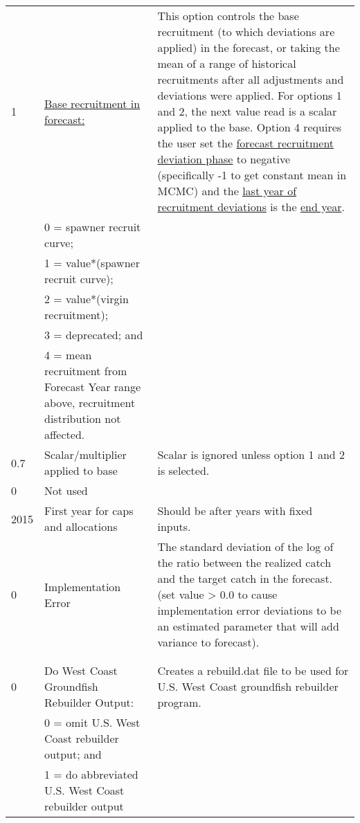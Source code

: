 \begin{landscape}
{\begin{longtable}{p{2cm} p{7cm} p{12cm}}
  \hline
  1 \Tstrut & \hyperlink{ForeSpawn}{Base recruitment in forecast:} \hypertarget{FcastRecruitment}{} & \multirow{1}{1cm}[-0.25cm]{\parbox{12cm}{This option controls the base recruitment (to which deviations are applied) in the forecast, or taking the mean of a range of historical recruitments after all adjustments and deviations were applied. For options 1 and 2, the next value read is a scalar applied to the base. Option 4 requires the user set the \hyperlink{FcastRecDevPhase}{forecast recruitment deviation phase} to negative (specifically -1 to get constant mean in MCMC) and the \hyperlink{RecDevEndYear}{last year of recruitment deviations} is the \hyperlink{EndYear}{end year}.}} \\
    & 0 = spawner recruit curve; & \\
    & 1 = value*(spawner recruit curve); & \\
    & 2 = value*(virgin recruitment); & \\
    & 3 = deprecated; and & \\
    & 4 = mean recruitment from Forecast Year range above, recruitment distribution not affected. & \Bstrut\\

  \hline
  0.7 \Tstrut & Scalar/multiplier applied to base & \multirow{1}{1cm}[-0.05cm]{\parbox{12cm}{Scalar is ignored unless option 1 and 2 is selected.}} \Bstrut\\

  \hline
  0 & Not used & \Tstrut\Bstrut\\
  
  \hline
  2015 \Tstrut & First year for caps and allocations & \multirow{1}{1cm}[-0.10cm]{\parbox{12cm}{Should be after years with fixed inputs.}} \Bstrut\\

  \hline
  0 \Tstrut & Implementation Error & \multirow{1}{1cm}[-0.2cm]{\parbox{12cm}{The standard deviation of the log of the ratio between the realized catch and the target catch in the forecast. (set value > 0.0 to cause implementation error deviations to be an estimated parameter that will add variance to forecast).}} \Bstrut\\
    & & \Bstrut\\
    & & \Bstrut\\

  \hline
  0 \Tstrut & Do West Coast Groundfish Rebuilder Output: &\multirow{1}{1cm}[-0.2cm]{\parbox{12cm}{Creates a rebuild.dat file to be used for U.S. West Coast groundfish rebuilder program.}} \\
    & 0 = omit U.S. West Coast rebuilder output; and & \\
    & 1 = do abbreviated U.S. West Coast rebuilder output \Bstrut\\


\end{longtable}}
\end{landscape}
